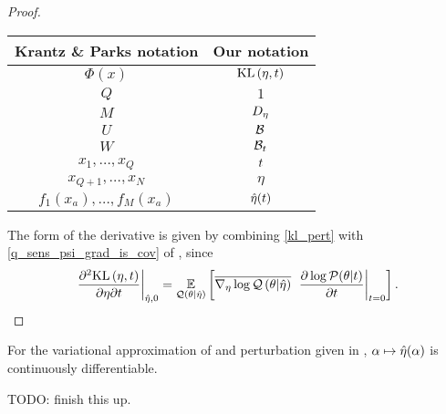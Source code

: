 \begin{thm}
\begin{proof}
\begin{center}
\begin{tabular}{|c|c|}
%
\hline Krantz \& Parks notation & Our notation \\\hline
$\Phi(x)$                       & $\mathrm{KL}\left(\eta, t\right)$ \\\hline
$Q$                             & $1$ \\\hline
$M$                             & ${D_{\eta}}$ \\\hline
$U$                             & $\mathcal{B}$ \\\hline
$W$                             & $\mathcal{B}_t$ \\\hline
$x_1,\ldots,x_Q$                & $t$ \\\hline
$x_{Q+1},\ldots,x_N$            & $\eta$ \\\hline
$f_1(x_a), \ldots,f_M(x_a)$     & $\hat\eta(t)$ \\\hline
%
\end{tabular}
\end{center}

The form of the derivative is given by combining \eqref{kl_pert} with
\eqref{q_sens_psi_grad_is_cov} of , since
%
\begin{align*}
%
\fracat{\partial^2 \KL{\eta, \t}}
       {\partial \eta \partial \t}
       {\etaopt, 0} =
\expect{\q(\theta \vert \etaopt)}{
    \lqgradbar{\theta \vert \etaopt}
    \fracat{\partial \log \p(\theta \vert \t)}{\partial \t}{\t=0}
}.
%
\end{align*}
%

%
\end{proof}
%
\end{thm}


\begin{cor}
%
For the variational approximation of  and perturbation
given in , $\alpha \mapsto \hat\eta(\alpha)$
is continuously differentiable.

TODO: finish this up.
%
\end{cor}

